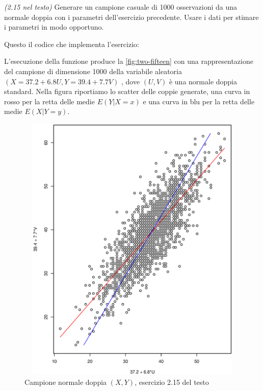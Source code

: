 \begin{exercise}\emph{(2.15 nel testo)}
  Generare un campione casuale di 1000 osservazioni da una normale
  doppia con i parametri dell'esercizio precedente. Usare i dati per
  stimare i parametri in modo opportuno.
\end{exercise}
Questo il codice che implementa l'esercizio:

L'esecuzione della funzione produce la \autoref{fig:two-fifteen} con
una rappresentazione del campione di dimensione 1000 della variabile
aleatoria $(X = 37.2 + 6.8U, Y = 39.4 + 7.7V)$ , dove $(U, V)$ \`e una
normale doppia standard. Nella figura riportiamo lo scatter delle
coppie generate, una curva in rosso per la retta delle medie
$E(Y|X=x)$ e una curva in blu per la retta delle medie $E(X|Y=y)$.
\begin{figure}[htb]
\centering
\includegraphics[height=13cm,width=13cm]{r-sources/exercises/chapter-two/two-fifteen.ps}
\caption{Campione normale doppia $(X, Y)$, esercizio 2.15 del testo}
\label{fig:two-fifteen}
\end{figure}
